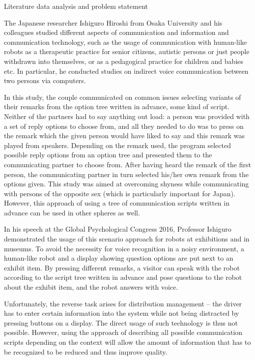 Literature data analysis and problem statement 

The Japanese researcher Ishiguro Hiroshi from Osaka University and his colleagues studied different aspects of communication and information and communication technology, such as the usage of communication with human-like robots as a therapeutic practice for senior citizens, autistic persons or just people withdrawn into themselves, or as a pedagogical practice for children and babies etc. In particular, he conducted studies on indirect voice communication between two persons via computers. 

In this study, the couple communicated on common issues selecting variants of their remarks from the option tree written in advance, some kind of script. Neither of the partners had to say anything out load: a person was provided with a set of reply options to choose from, and all they needed to do was to press on the remark which the given person would have liked to say and this remark was played from speakers. Depending on the remark used, the program selected possible reply options from an option tree and presented them to the communicating partner to choose from. After having heard the remark of the first person, the communicating partner in turn selected his/her own remark from the options given. This study was aimed at overcoming shyness while communicating with persons of the opposite sex (which is particularly important for Japan). However, this approach of using a tree of communication scripts written in advance can be used in other spheres as well. 

In his speech at the Global Psychological Congress 2016, Professor Ishiguro demonstrated the usage of this scenario approach for robots at exhibitions and in museums.  To avoid the necessity for voice recognition in a noisy environment, a human-like robot and a display showing question options are put next to an exhibit item. By pressing different remarks, a visitor can speak with the robot according to the script tree written in advance and pose questions to the robot about the exhibit item, and the robot answers with voice. 

Unfortunately, the reverse task arises for distribution management – the driver has to enter certain information into the system while not being distracted by pressing buttons on a display. The direct usage of such technology is thus not possible. However, using the approach of describing all possible communication scripts depending on the context will allow the amount of information that has to be recognized to be reduced and thus improve quality. 

